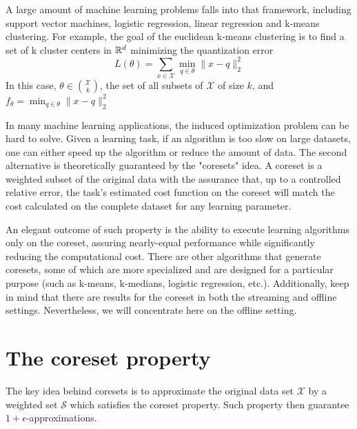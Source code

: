 A large amount of machine learning problems falls into that framework, including support vector machines, logistic regression, linear regression and k-means clustering. For example, the goal of the euclidean k-means clustering is to find a set of k cluster centers in $\mathbb{R}^d$ minimizing the quantization error
\begin{equation*}
L(\theta) = \sum_{x \in \mathcal{X}} \min_{q \in \theta} \lVert x - q \rVert^2_2
\end{equation*}
In this case, $\theta \in \binom{\mathcal{X}}{k}$, the set of all subsets of $\mathcal{X}$ of size $k$, and $f_\theta =  \min_{q \in \theta} \lVert x - q \rVert^2_2$

In many machine learning applications, the induced optimization problem can be hard to solve. Given a learning task, if an algorithm is too slow on large datasets, one can either speed up the algorithm or reduce the amount of data.
The second alternative is theoretically guaranteed by the "coresets" idea.
A coreset is a weighted subset of the original data with the assurance that, up to a controlled relative error, the task's estimated cost function on the coreset will match the cost calculated on the complete dataset for any learning parameter.

An elegant outcome of such property is the ability to execute learning algorithms only on the coreset, assuring nearly-equal performance while significantly reducing the computational cost. There are other algorithms that generate coresets, some of which are more specialized and are designed for a particular purpose (such as k-means, k-medians, logistic regression, etc.). Additionally, keep in mind that there are results for the coreset in both the streaming and offline settings. Nevertheless, we will concentrate here on the offline setting.


\section{The coreset property}

The key idea behind coresets is to approximate the original data
set $\mathcal{X}$ by a weighted set $\mathcal{S}$ which satisfies the coreset property. Such property then guarantee $1+\epsilon$-approximations.

